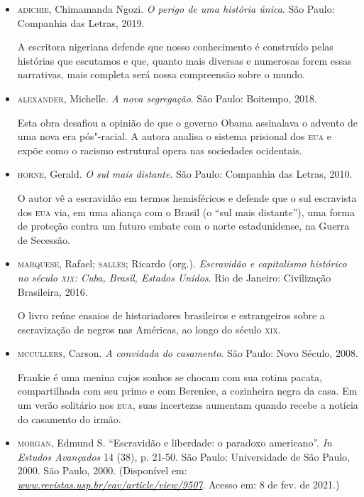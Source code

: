 \documentclass[12pt]{extarticle}
\begin{document}
\begin{itemize}
\item\textsc{adichie}, Chimamanda Ngozi. \textit{O perigo de uma história única}.
  São Paulo: Companhia das Letras, 2019.

A escritora nigeriana defende que nosso conhecimento é construído pelas
histórias que escutamos e que, quanto mais diversas e numerosas forem
essas narrativas, mais completa será nossa compreensão sobre o mundo.

\item\textsc{alexander}, Michelle. \textit{A nova segregação}. São Paulo: Boitempo,
  2018.

Esta obra desafiou a opinião de que o governo Obama assinalava o advento
de uma nova era pós"-racial. A autora analisa o sistema prisional dos \textsc{eua}
e expõe como o racismo estrutural opera nas sociedades ocidentais.

\item\textsc{horne}, Gerald. \textit{O sul mais distante}. São Paulo: Companhia das
  Letras, 2010.

O autor vê a escravidão em termos hemisféricos e defende que o sul
escravista dos \textsc{eua} via, em uma aliança com o Brasil (o ``sul mais
distante''), uma forma de proteção contra um futuro embate com o norte
estadunidense, na Guerra de Secessão.

\item\textsc{marquese}, Rafael; \textsc{salles}; Ricardo (org.). \textit{Escravidão e
  capitalismo histórico no século \textsc{xix}: Cuba, Brasil, Estados Unidos}.
  Rio de Janeiro: Civilização Brasileira, 2016.

O livro reúne ensaios de historiadores brasileiros e estrangeiros sobre
a escravização de negros nas Américas, ao longo do século \textsc{xix}.

\item\textsc{mccullers}, Carson. \textit{A convidada do casamento}. São Paulo: Novo
  Século, 2008.

Frankie é uma menina cujos sonhos se chocam com sua rotina pacata,
compartilhada com seu primo e com Berenice, a cozinheira negra da casa.
Em um verão solitário nos \textsc{eua}, suas incertezas aumentam quando recebe a
notícia do casamento do irmão.

\item\textsc{morgan}, Edmund S. ``Escravidão e liberdade: o paradoxo americano''.
  \emph{In} \textit{Estudos Avançados} 14 (38), p. 21-50. São Paulo:
  Universidade de São Paulo, 2000. São Paulo, 2000. (Disponível em:
  \href{http://www.revistas.usp.br/eav/article/view/9507}{\emph{www.revistas.usp.br/eav/article/view/9507}}.
  Acesso em: 8 de fev. de 2021.)


\end{itemize}
\end{document}
